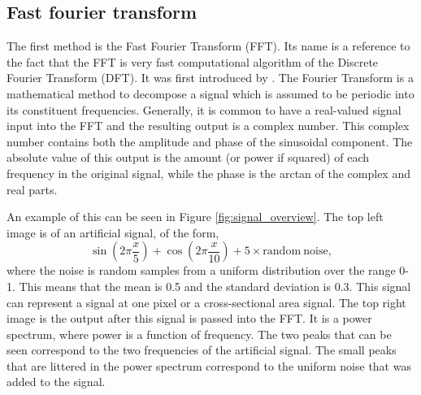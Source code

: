 \subsection{Fast fourier transform}

	The first method is the Fast Fourier Transform (FFT).
	Its name is a reference to the fact that the FFT is very fast computational algorithm of the Discrete Fourier Transform (DFT).
    It was first introduced by \cite{cooley1965algorithm}.
	The Fourier Transform is a mathematical method to decompose a signal which is assumed to be periodic into its constituent frequencies.
	Generally, it is common to have a real-valued signal input into the FFT and the resulting output is a complex number.
	This complex number contains both the amplitude and phase of the sinusoidal component.
	The absolute value of this output is the amount (or power if squared) of each frequency in the original signal, while the phase is the arctan of the complex and real parts. 
	
    An example of this can be seen in Figure \ref{fig:signal_overview}.
    The top left image is of an artificial signal, of the form, $$\sin\left(2\pi \frac{x}{5}\right) + \cos\left(2\pi \frac{x}{10}\right) + 5\times\mathrm{random\ noise},$$ where the noise is random samples from a uniform distribution over the range 0-1.
    This means that the mean is 0.5 and the standard deviation is $0.3$.
    This signal can represent a signal at one pixel or a cross-sectional area signal.
    The top right image is the output after this signal is passed into the FFT.
    It is a power spectrum, where power is a function of frequency.
    The two peaks that can be seen correspond to the two frequencies of the artificial signal.
    The small peaks that are littered in the power spectrum correspond to the uniform noise that was added to the signal.
    
